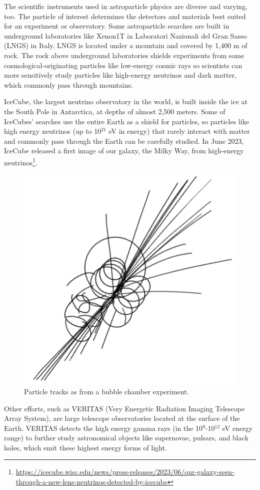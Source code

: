 The scientific instruments used in astroparticle physics are diverse and varying, too. The particle of interest determines the detectors and materials best suited for an experiment or observatory. Some astroparticle searches are built in underground laboratories like Xenon1T in Laboratori Nazionali del Gran Sasso (LNGS) in Italy. LNGS is located under a mountain and covered by 1,400 m of rock. The rock above underground laboratories shields experiments from some cosmological-originating particles like low-energy cosmic rays so scientists can more sensitively study particles like high-energy neutrinos and dark matter, which commonly pass through mountains. 

IceCube, the largest neutrino observatory in the world, is built inside the ice at the South Pole in Antarctica, at depths of almost 2,500 meters. Some of IceCubes' searches use the entire Earth as a shield for particles, so particles like high energy neutrinos (up to 10$^{21}$ eV in energy) that rarely interact with matter and commonly pass through the Earth can be carefully studied. In June 2023, IceCube released a first image of our galaxy, the Milky Way, from high-energy neutrinos\footnote{\href{https://icecube.wisc.edu/news/press-releases/2023/06/our-galaxy-seen-through-a-new-lens-neutrinos-detected-by-icecube/}{https://icecube.wisc.edu/news/press-releases/2023/06/our-galaxy-seen-through-a-new-lens-neutrinos-detected-by-icecube}}.

\begin{figure}[h!]
    \centering
    \includegraphics[width=0.5\linewidth]{img/particle_detector.png}
    \caption{Particle tracks as from a bubble chamber experiment.}
    \label{fig:particle_detector}
\end{figure}

Other efforts, such as VERITAS (Very Energetic Radiation Imaging Telescope Array System), are large telescope observatories located at the surface of the Earth. VERITAS detects the high energy gamma rays (in the 10$^9$-10$^{12}$ eV energy range) to further study astronomical objects like supernovae, pulsars, and black holes, which emit these highest energy forms of light.



